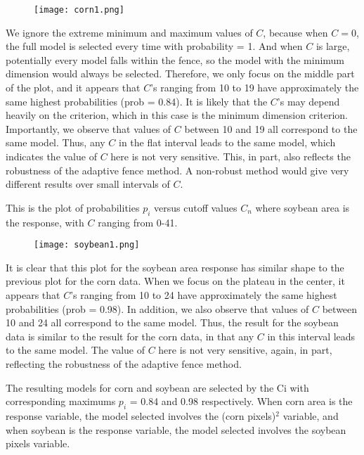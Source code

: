 \documentclass[11pt,letter]{article}
\begin{document}
\begin{figure}[h!]
  \centering
  \texttt{[image: corn1.png]}
\end{figure}

 We ignore the extreme minimum and maximum values of $C$, because when $C=0$, the full model is selected every time with probability = 1.  And when $C$ is large, potentially every model falls within the fence, so the model with the minimum dimension would  always be selected.  Therefore, we  only focus on the middle part of the plot, and it appears that $C$’s ranging from 10 to 19 have approximately the same highest probabilities (prob = 0.84).  It is likely that the $C$’s may depend heavily on the criterion, which in this case is the minimum dimension criterion.  Importantly, we observe that values of $C$ between 10 and 19 all correspond to the same model. Thus, any $C$ in the flat interval leads to the same model, which indicates the value of $C$ here is not very sensitive.  This, in part, also reflects the robustness of the adaptive fence method.  A non-robust method would give very different results over small intervals of $C$. 

This is the plot of probabilities $p_i$ versus cutoff values $C_n$ where soybean area is the response, with $C$ ranging from 0-41.

\begin{figure}[H]
  \centering
  \texttt{[image: soybean1.png]}
\end{figure}

It is clear that this plot for the soybean area response  has similar shape to the previous plot for the corn data. When we focus on the plateau in the center, it appears that $C$’s ranging from 10 to 24 have approximately the same highest probabilities (prob = 0.98).  In addition, we also observe that values of $C$ between 10 and 24 all correspond to the same model. Thus, the result for the soybean data is similar to the result for the corn data, in that any $C$ in this interval leads to the same model.  The value of $C$ here is not very sensitive, again, in part, reflecting the robustness of the adaptive fence method. 

The resulting models for corn and soybean are selected by the Ci with corresponding maximums $p_i$ = 0.84 and 0.98 respectively.  When corn area is the response variable, the model selected involves the (corn pixels)$^2$ variable, and when soybean is the response variable, the model selected involves the soybean pixels variable.
\end{document}
